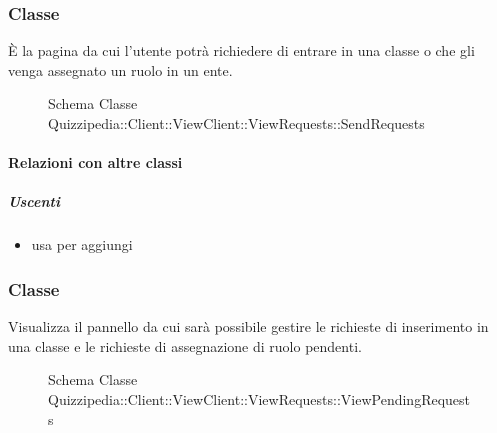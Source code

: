 \subsubsection{Classe }
È la pagina da cui l'utente potrà richiedere di entrare in una classe o che gli venga assegnato un ruolo in un ente.
\begin{figure}[H]
\centering
\noindent{}
\caption[Schema Classe SendRequests]{Schema Classe Quizzipedia::Client::ViewClient::ViewRequests::SendRequests}
\end{figure}
\paragraph{Relazioni con altre classi}
\subparagraph{Uscenti}
\begin{itemize}
\item usa  per aggiungi
\end{itemize}
\subsubsection{Classe }
Visualizza il pannello da cui sarà possibile gestire le richieste di inserimento in una classe e le richieste di assegnazione di ruolo pendenti.
\begin{figure}[H]
\centering
\noindent{}
\caption[Schema Classe ViewPendingRequests]{Schema Classe Quizzipedia::Client::ViewClient::ViewRequests::ViewPendingRequests}
\end{figure}
